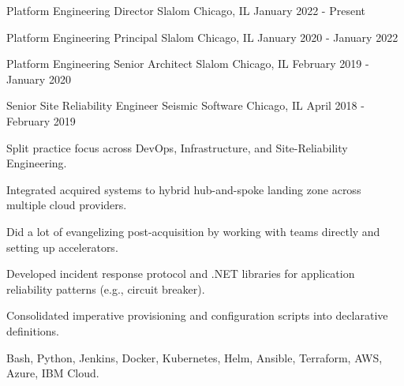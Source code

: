 

\begin{cventries}

  \cventry
    {Platform Engineering Director} %
    {Slalom} %
    {Chicago, IL} %
    {January 2022 - Present} %
    {}

  \cventry
    {Platform Engineering Principal} %
    {Slalom} %
    {Chicago, IL} %
    {January 2020 - January 2022} %
    {}

  \cventry
    {Platform Engineering Senior Architect} %
    {Slalom} %
    {Chicago, IL} %
    {February 2019 - January 2020} %
    {}

  \cventry
    {Senior Site Reliability Engineer} %
    {Seismic Software} %
    {Chicago, IL} %
    {April 2018 - February 2019} %
    {
      \begin{cvitems} %
        \item {Split practice focus across DevOps, Infrastructure, and Site-Reliability Engineering.}
        \item {Integrated acquired systems to hybrid hub-and-spoke landing zone across multiple cloud providers.}
        \item {Did a lot of evangelizing post-acquisition by working with teams directly and setting up accelerators.}
        \item {Developed incident response protocol and .NET libraries for application reliability patterns (e.g., circuit breaker).}
        \item {Consolidated imperative provisioning and configuration scripts into declarative definitions.}
        \item {Bash, Python, Jenkins, Docker, Kubernetes, Helm, Ansible, Terraform, AWS, Azure, IBM Cloud.}
      \end{cvitems}
    }


\end{cventries}
